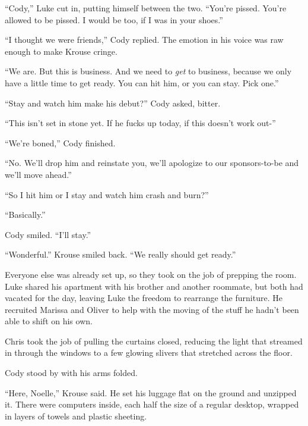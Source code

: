 ``Cody,'' Luke cut in, putting himself between the two.  ``You're pissed.  You're allowed to be pissed.  I would be too, if I was in your shoes.''



``I thought we were friends,'' Cody replied.  The emotion in his voice was raw enough to make Krouse cringe.



``We are.  But this is business.  And we need to \emph{get} to business, because we only have a little time to get ready.  You can hit him, or you can stay.  Pick one.''



``Stay and watch him make his debut?''  Cody asked, bitter.



``This isn't set in stone yet.  If he fucks up today, if this doesn't work out-''



``We're boned,'' Cody finished.



``No.  We'll drop him and reinstate you, we'll apologize to our sponsors-to-be and we'll move ahead.''



``So I hit him or I stay and watch him crash and burn?''



``Basically.''



Cody smiled.  ``I'll stay.''



``Wonderful.''  Krouse smiled back.  ``We really should get ready.''



Everyone else was already set up, so they took on the job of prepping the room.  Luke shared his apartment with his brother and another roommate, but both had vacated for the day, leaving Luke the freedom to rearrange the furniture.  He recruited Marissa and Oliver to help with the moving of the stuff he hadn't been able to shift on his own.



Chris took the job of pulling the curtains closed, reducing the light that streamed in through the windows to a few glowing slivers that stretched across the floor.



Cody stood by with his arms folded.



``Here, Noelle,'' Krouse said.  He set his luggage flat on the ground and unzipped it.  There were computers inside, each half the size of a regular desktop, wrapped in layers of towels and plastic sheeting.



